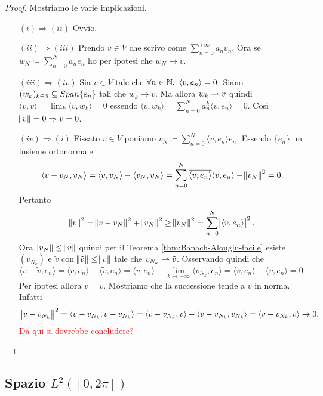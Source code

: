 \begin{proof}   
    Mostriamo le varie implicazioni. 
    \begin{enumerate}
        \item[$ (i) \Rightarrow (ii) $] Ovvio.
        \item[$ (ii) \Rightarrow (iii) $] Prendo $ v \in V $ che scrivo come $ \sum_{n = 0}^{+\infty} a_n v_n $. Ora se $ w_{N} \coloneqq \sum_{n = 0}^{N} a_ne_n $ ho per ipotesi che $ w_N \to v $. 
        \item[$ (iii) \Rightarrow (iv) $] Sia $ v \in V $ tale che $ \forall n \in \mathbb{N}, \ {\langle v, e_n \rangle} = 0 $. Siano $ (w_k)_{k \in \mathbb{N}} \subseteq Span{\{e_n\}} $ tali che $ w_k \to v $. Ma allora $ w_k \rightharpoonup v $ quindi $ {\langle v, v \rangle} = \lim_{k} {\langle v, w_k \rangle} = 0 $ essendo $ {\langle v, w_k \rangle} = \sum_{n = 0}^{N} a_n^k {\langle v, e_n \rangle} = 0 $. Così $ \norm{v} = 0 \Rightarrow v = 0 $. 
        \item[$ (iv) \Rightarrow (i) $] Fissato $ v \in V $ poniamo $ v_N \coloneqq \sum_{n = 0}^{N} {\langle v, e_n \rangle} e_n $. Essendo $ \{e_n\} $ un insieme ortonormale
        \[
            {\langle v - v_N, v_N \rangle} = {\langle v, v_N \rangle} - {\langle v_N, v_N \rangle} = \sum_{n = 0}^{N} \overline{{\langle v, e_n \rangle}}{\langle v, e_n \rangle} - \norm{v_N}^2 = 0.
        \]
        Pertanto
        \[
            \norm{v}^2 = \norm{v - v_N}^2 + \norm{v_N}^2 \geq \norm{v_N}^2 = \sum_{n = 0}^{N} \abs{{\langle v, e_n \rangle}}^2.
        \]
        Ora $ \norm{v_N} \leq \norm{v} $ quindi per il Teorema \ref{thm:Banach-Alouglu-facile} esiste $ (v_{N_k}) $ e $ \tilde{v} $ con $ \norm{\tilde{v}} \leq \norm{v} $ tale che $ v_{N_k} \rightharpoonup \tilde{v} $. Osservando quindi che 
        \[
            {\langle v - \tilde{v}, e_n \rangle} = {\langle v, e_n \rangle} - {\langle \tilde{v}, e_n \rangle} = {\langle v, e_n \rangle} - \lim_{k \to + \infty} {\langle v_{N_k}, e_n \rangle} = {\langle v, e_n \rangle} - {\langle v, e_n \rangle} = 0.
        \]
        Per ipotesi allora $ \tilde{v} = v $. Mostriamo che la successione tende a $ v $ in norma. Infatti
        \[
            \norm{v - v_{N_k}}^2 = {\langle v - v_{N_k}, v - v_{N_k}\rangle} = {\langle v - v_{N_k}, v \rangle} - {\langle v - v_{N_k}, v_{N_k} \rangle} = {\langle v - v_{N_k}, v \rangle} \to 0.
        \]
        \textcolor{red}{Da qui si dovrebbe concludere?} \qedhere
    \end{enumerate}
\end{proof}

\subsection{Spazio $ L^2([0, 2\pi]) $}
